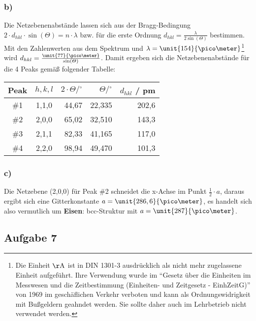 \documentclass[11pt]{article}
\begin{document}
\subsubsection*{b)}
Die Netzebenenabstände lassen sich aus der Bragg-Bedingung
$2 \cdot d_{hkl} \cdot \sin(\varTheta) = n \cdot \lambda$ bzw. für die erste Ordnung
$d_{hkl} = \frac{\lambda}{2 \sin(\varTheta)}$ bestimmen. Mit den Zahlenwerten aus dem
Spektrum und $\lambda =\unit{154}{\pico \meter}$\footnote{Die Einheit $\mathrm{\AA}$
ist in DIN 1301-3 ausdrücklich als nicht mehr zugelassene Einheit aufgeführt.
Ihre Verwendung wurde im "`Gesetz über die Einheiten im Messwesen und die
Zeitbestimmung (Einheiten- und Zeitgesetz - EinhZeitG)"' von 1969 im
geschäflichen Verkehr verboten und kann als Ordnungswidrigkeit mit
Bußgeldern geahndet werden. Sie sollte daher auch im Lehrbetrieb nicht verwendet werden.}
wird $d_{hkl} = \frac{\unit{77}{\pico \meter}}{\sin(\varTheta)}$.
Damit ergeben sich die Netzebenenabstände für die 4 Peaks gemäß folgender Tabelle:
\begin{table}[htbp]
\begin{center}
\begin{tabular}{|c|c|r|r|r|}
\hline
Peak & $h,k,l$ & $ 2 \cdot \varTheta / { }^\circ $ & $ \varTheta / { }^\circ $
  & $d_{hkl}$ / pm \\ \hline \hline
\#1 & 1,1,0 & 44,67 & 22,335 & 202,6 \\ \hline
\#2 & 2,0,0 & 65,02 & 32,510 & 143,3 \\ \hline
\#3 & 2,1,1 & 82,33 & 41,165 & 117,0 \\ \hline
\#4 & 2,2,0 & 98,94 & 49,470 & 101,3 \\ \hline
\end{tabular}
\end{center}
\label{}
\end{table}

\subsubsection*{c)}
Die Netzebene (2,0,0) für Peak \#2 schneidet die x-Achse im Punkt
$\frac{1}{2} \cdot a$, daraus ergibt sich eine Gitterkonstante
$a = \unit{286,6}{\pico \meter}$, es handelt sich also vermutlich um
\textbf{Eisen}: bcc-Struktur mit $a = \unit{287}{\pico \meter}$.

\subsection*{Aufgabe 7}
\end{document}
